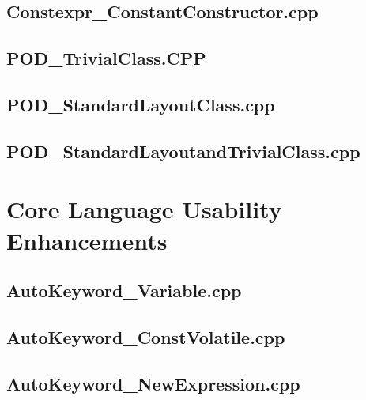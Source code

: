 \documentclass[11pt]{report}
\newcommand{\Cpp}{\lstset{language=C++,keywordstyle=\bfseries,breaklines,breakindent=30pt}}
\begin{document}
\begin{appendix}
\subsection{Constexpr\_ConstantConstructor.cpp}
\label{Constexpr_ConstantConstructor}


\subsection{POD\_TrivialClass.CPP}
\label{POD_TrivialClass}


\subsection{POD\_StandardLayoutClass.cpp}
\label{POD_StandardLayoutClass}


\subsection{POD\_StandardLayoutandTrivialClass.cpp}
\label{POD_StandardLayoutandTrivialClass}


\section{Core Language Usability Enhancements}
\label{Appendix: corelanguage usabiliy enhancements}

\Cpp

\subsection{AutoKeyword\_Variable.cpp}
\label{AutoKeyword_Variable}


\subsection{AutoKeyword\_ConstVolatile.cpp}
\label{AutoKeyword_ConstVolatile}


\subsection{AutoKeyword\_NewExpression.cpp}
\label{AutoKeyword_NewExpression}



\end{appendix}
\end{document}
